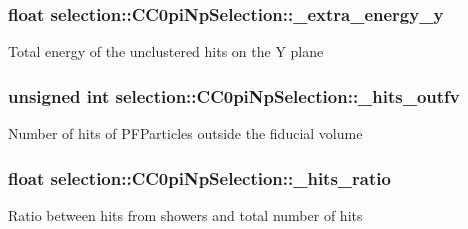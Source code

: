\subsubsection[{\texorpdfstring{\+\_\+extra\+\_\+energy\+\_\+y}{_extra_energy_y}}]{\setlength{\rightskip}{0pt plus 5cm}float selection\+::\+C\+C0pi\+Np\+Selection\+::\+\_\+extra\+\_\+energy\+\_\+y\hspace{0.3cm}{\ttfamily [private]}}\hypertarget{classselection_1_1CC0piNpSelection_a2e386c361ecc27d22ff2642e80a629e4}{}\label{classselection_1_1CC0piNpSelection_a2e386c361ecc27d22ff2642e80a629e4}
Total energy of the unclustered hits on the Y plane 
\subsubsection[{\texorpdfstring{\+\_\+hits\+\_\+outfv}{_hits_outfv}}]{\setlength{\rightskip}{0pt plus 5cm}unsigned int selection\+::\+C\+C0pi\+Np\+Selection\+::\+\_\+hits\+\_\+outfv\hspace{0.3cm}{\ttfamily [private]}}\hypertarget{classselection_1_1CC0piNpSelection_ac39ec79d190fb925f8d20b03cbeb0605}{}\label{classselection_1_1CC0piNpSelection_ac39ec79d190fb925f8d20b03cbeb0605}
Number of hits of P\+F\+Particles outside the fiducial volume 
\subsubsection[{\texorpdfstring{\+\_\+hits\+\_\+ratio}{_hits_ratio}}]{\setlength{\rightskip}{0pt plus 5cm}float selection\+::\+C\+C0pi\+Np\+Selection\+::\+\_\+hits\+\_\+ratio\hspace{0.3cm}{\ttfamily [private]}}\hypertarget{classselection_1_1CC0piNpSelection_a32b43003c9168115bc94544049e439a2}{}\label{classselection_1_1CC0piNpSelection_a32b43003c9168115bc94544049e439a2}
Ratio between hits from showers and total number of hits 
